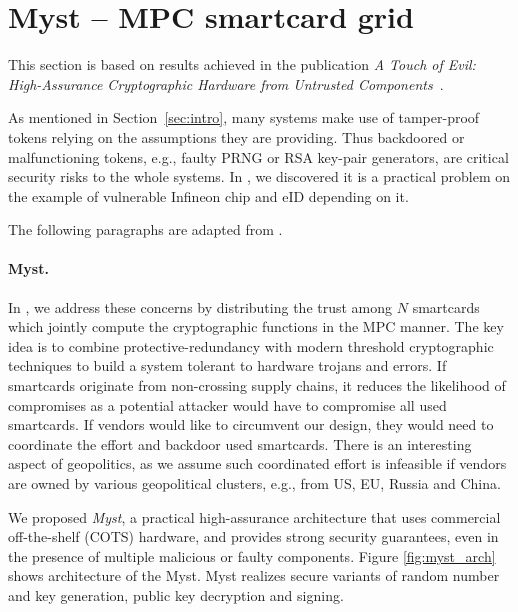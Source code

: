 \documentclass[
  digital, %
  twoside, %
  table,   %
  lof,     %
  lot,     %
]{fithesis3}
\newcounter{ph4_show_guides}
\theoremstyle{definition}
\theoremstyle{remark}
\begin{document}
% 

\section{Myst -- MPC smartcard grid}\label{sec:res:myst}
This section is based on results achieved in the publication \emph{A Touch of Evil: High-Assurance Cryptographic Hardware from Untrusted Components}~\cite{2017-ccs-mavroudis}. 

As mentioned in Section~\ref{sec:intro}, many systems make use of tamper-proof tokens relying on the assumptions they are providing. Thus backdoored or malfunctioning tokens, e.g., faulty PRNG or RSA key-pair generators, are 
critical security risks to the whole systems. In \cite{2017-ccs-nemec}, we discovered it is a practical problem on the example of vulnerable Infineon chip and eID depending on it.

The following paragraphs are adapted from \cite{2017-ccs-mavroudis}.

\paragraph{Myst.}%
In \cite{2017-ccs-mavroudis}, we address these concerns by distributing the trust among $N$ smartcards which jointly compute the cryptographic functions in the MPC manner. 
The key idea is to combine
protective-redundancy with modern threshold cryptographic techniques to build a system tolerant to hardware trojans and errors. 
If smartcards originate from non-crossing supply chains, it reduces the likelihood of compromises as a potential attacker would have to compromise all used smartcards. 
If vendors would like to circumvent our design, they would need to coordinate the effort and backdoor used smartcards. There is an interesting aspect of geopolitics, as we assume such coordinated effort is infeasible if vendors are owned by various geopolitical clusters, e.g., from US, EU, Russia and China.

We proposed \emph{Myst}, a practical high-assurance architecture that uses commercial off-the-shelf (COTS) hardware, and provides strong security guarantees, even in the presence of multiple malicious or faulty components. Figure \ref{fig:myst_arch} shows architecture of the Myst.
Myst realizes secure variants of random number and key generation, public key decryption and signing.  
\end{document}
